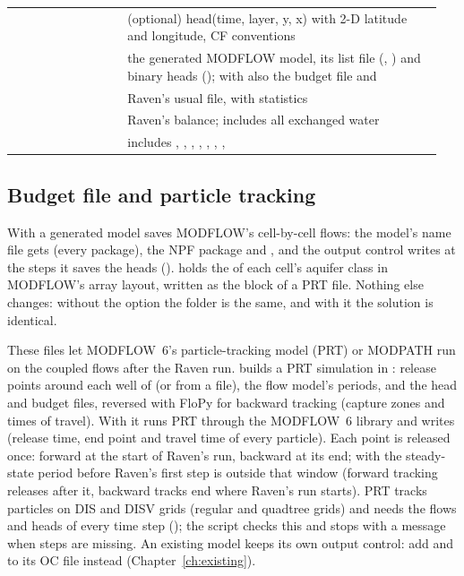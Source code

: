 \begin{table}[!htbp]
\begin{tabular}{P{0.25\linewidth}P{0.698\linewidth}}
 & (optional) head(time, layer, y, x) with 2-D latitude and longitude, CF conventions\\
 & the generated MODFLOW model, its list file (, ) and binary heads (); with  also the budget file  and \\
 & Raven's usual file, with  statistics\\
 & Raven's balance; includes all exchanged water\\
 & includes , , , , , , , \\\bottomrule
\end{tabular}
\end{table}

\subsection{Budget file and particle tracking}\label{sec:budgetfile}
With  a generated model saves MODFLOW's cell-by-cell flows: the model's name file gets
 (every package), the NPF package  and , and the output
control writes  at the steps it saves the heads ().  holds the
 of each cell's aquifer class in MODFLOW's array layout, written as the  block of a PRT  file.
Nothing else changes: without the option the  folder is the same, and with it the solution is identical.

These files let MODFLOW~6's particle-tracking model (PRT) or MODPATH run on the coupled flows after the Raven run.
 builds a PRT simulation in
: release points around each well of  (or from a file), the flow model's periods, and
the head and budget files, reversed with FloPy for backward tracking (capture zones and times of travel). With 
it runs PRT through the MODFLOW~6 library and writes  (release time, end point and travel time of every
particle). Each point is released once: forward at the start of Raven's run, backward at its end; with
 the steady-state period before Raven's first step is outside that window (forward
tracking releases after it, backward tracks end where Raven's run starts). PRT
tracks particles on DIS and DISV grids (regular and quadtree grids) and needs the flows and heads of every time step
(); the script checks this and stops with a message when steps are missing. An existing model keeps its own output control: add  and
 to its OC file instead (Chapter~\ref{ch:existing}).

